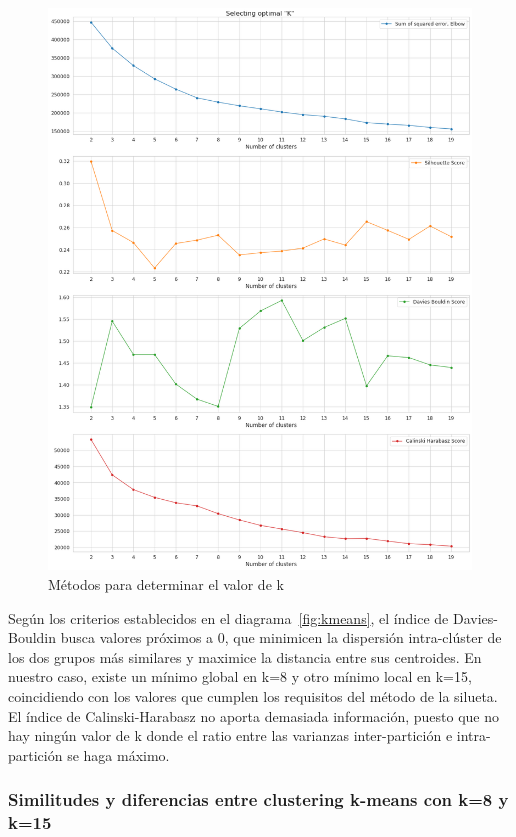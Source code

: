 \documentclass[a4paper, 12pt]{book}
\begin{document}
\begin{figure}[H]
    \centering
    \includegraphics[height=.53\textheight]{img/select_k.png}
    \caption{Métodos para determinar el valor de k}\label{fig:determine_k}
\end{figure}

Según los criterios establecidos en el diagrama~\ref{fig:kmeans}, el índice de Davies-Bouldin busca valores próximos a 0, que minimicen la dispersión intra-clúster de los dos grupos más similares y maximice la distancia entre sus centroides. En nuestro caso, existe un mínimo global en k=8 y otro mínimo local en k=15, coincidiendo con los valores que cumplen los requisitos del método de la silueta. El índice de Calinski-Harabasz no aporta demasiada información, puesto que no hay ningún valor de k donde el ratio entre las varianzas inter-partición e intra-partición se haga máximo.

\subsubsection{Similitudes y diferencias entre clustering k-means con k=8 y k=15}
\label{sec:k8_k15}
\end{document}

